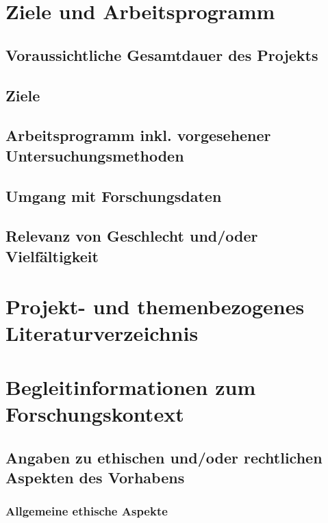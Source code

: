 \documentclass[de]{dfg-proposal}
\begin{document}
\section{Ziele und Arbeitsprogramm}\label{sec:ziele-und-arbeitsprogramm}

\subsection{Voraussichtliche Gesamtdauer des Projekts}

\subsection{Ziele}

\subsection{Arbeitsprogramm inkl. vorgesehener Untersuchungsmethoden}

\subsection{Umgang mit Forschungsdaten}

\subsection{Relevanz von Geschlecht und/oder Vielfältigkeit}

\section{Projekt- und themenbezogenes Literaturverzeichnis}\label{sec:literaturverzeichnis}

\printbibliography

\partbreak

\section{Begleitinformationen zum Forschungskontext}\label{sec:begleitinformationen-zum-forschungskontext}

\subsection{Angaben zu ethischen und/oder rechtlichen Aspekten des Vorhabens}

\subsubsection{Allgemeine ethische Aspekte}
\end{document}

